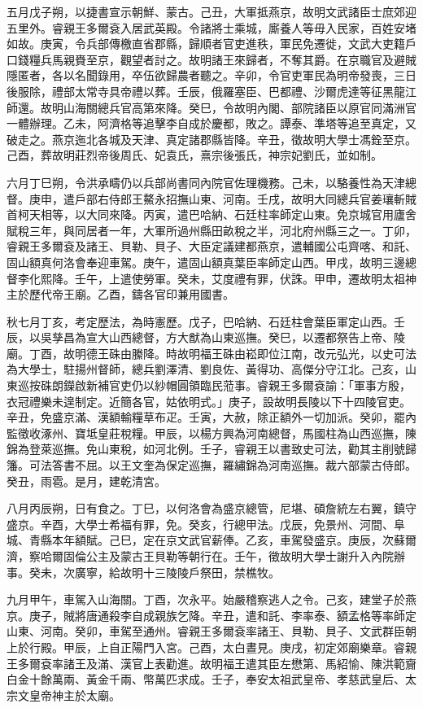 \begin{pinyinscope}
五月戊子朔，以捷書宣示朝鮮、蒙古。己丑，大軍抵燕京，故明文武諸臣士庶郊迎五里外。睿親王多爾袞入居武英殿。令諸將士乘城，廝養人等毋入民家，百姓安堵如故。庚寅，令兵部傳檄直省郡縣，歸順者官吏進秩，軍民免遷徙，文武大吏籍戶口錢糧兵馬親賚至京，觀望者討之。故明諸王來歸者，不奪其爵。在京職官及避賊隱匿者，各以名聞錄用，卒伍欲歸農者聽之。辛卯，令官吏軍民為明帝發喪，三日後服除，禮部太常寺具帝禮以葬。壬辰，俄羅塞臣、巴都禮、沙爾虎達等征黑龍江師還。故明山海關總兵官高第來降。癸巳，令故明內閣、部院諸臣以原官同滿洲官一體辦理。乙未，阿濟格等追擊李自成於慶都，敗之。譚泰、準塔等追至真定，又破走之。燕京迤北各城及天津、真定諸郡縣皆降。辛丑，徵故明大學士馮銓至京。己酉，葬故明莊烈帝後周氏、妃袁氏，熹宗後張氏，神宗妃劉氏，並如制。

六月丁巳朔，令洪承疇仍以兵部尚書同內院官佐理機務。己未，以駱養性為天津總督。庚申，遣戶部右侍郎王鰲永招撫山東、河南。壬戌，故明大同總兵官姜瓖斬賊首柯天相等，以大同來降。丙寅，遣巴哈納、石廷柱率師定山東。免京城官用廬舍賦稅三年，與同居者一年，大軍所過州縣田畝稅之半，河北府州縣三之一。丁卯，睿親王多爾袞及諸王、貝勒、貝子、大臣定議建都燕京，遣輔國公屯齊喀、和託、固山額真何洛會奉迎車駕。庚午，遣固山額真葉臣率師定山西。甲戌，故明三邊總督李化熙降。壬午，上遣使勞軍。癸未，艾度禮有罪，伏誅。甲申，遷故明太祖神主於歷代帝王廟。乙酉，鑄各官印兼用國書。

秋七月丁亥，考定歷法，為時憲歷。戊子，巴哈納、石廷柱會葉臣軍定山西。壬辰，以吳孳昌為宣大山西總督，方大猷為山東巡撫。癸巳，以遷都祭告上帝、陵廟。丁酉，故明德王硃由縢降。時故明福王硃由崧即位江南，改元弘光，以史可法為大學士，駐揚州督師，總兵劉澤清、劉良佐、黃得功、高傑分守江北。己亥，山東巡按硃朗鑅啟新補官吏仍以紗帽圓領臨民蒞事。睿親王多爾袞諭：「軍事方殷，衣冠禮樂未遑制定。近簡各官，姑依明式。」庚子，設故明長陵以下十四陵官吏。辛丑，免盛京滿、漢額輸糧草布疋。壬寅，大赦，除正額外一切加派。癸卯，罷內監徵收涿州、寶坻皇莊稅糧。甲辰，以楊方興為河南總督，馬國柱為山西巡撫，陳錦為登萊巡撫。免山東稅，如河北例。壬子，睿親王以書致史可法，勸其主削號歸籓。可法答書不屈。以王文奎為保定巡撫，羅繡錦為河南巡撫。裁六部蒙古侍郎。癸丑，雨雹。是月，建乾清宮。

八月丙辰朔，日有食之。丁巳，以何洛會為盛京總管，尼堪、碩詹統左右翼，鎮守盛京。辛酉，大學士希福有罪，免。癸亥，行總甲法。戊辰，免景州、河間、阜城、青縣本年額賦。己巳，定在京文武官薪俸。乙亥，車駕發盛京。庚辰，次蘇爾濟，察哈爾固倫公主及蒙古王貝勒等朝行在。壬午，徵故明大學士謝升入內院辦事。癸未，次廣寧，給故明十三陵陵戶祭田，禁樵牧。

九月甲午，車駕入山海關。丁酉，次永平。始嚴稽察逃人之令。己亥，建堂子於燕京。庚子，賊將唐通殺李自成親族乞降。辛丑，遣和託、李率泰、額孟格等率師定山東、河南。癸卯，車駕至通州。睿親王多爾袞率諸王、貝勒、貝子、文武群臣朝上於行殿。甲辰，上自正陽門入宮。己酉，太白晝見。庚戌，初定郊廟樂章。睿親王多爾袞率諸王及滿、漢官上表勸進。故明福王遣其臣左懋第、馬紹愉、陳洪範齎白金十餘萬兩、黃金千兩、幣萬匹求成。壬子，奉安太祖武皇帝、孝慈武皇后、太宗文皇帝神主於太廟。


\end{pinyinscope}
